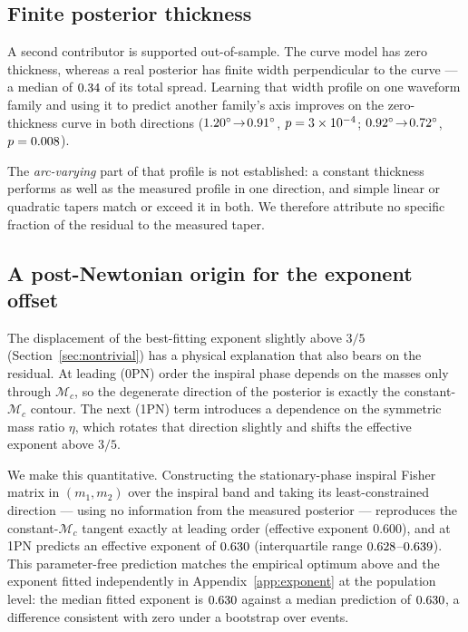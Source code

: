 \documentclass[aps,preprint,amsmath,amssymb,nofootinbib,superscriptaddress]{revtex4-2}
\begin{document}
\subsection{Finite posterior thickness}
\label{sec:thickness}
A second contributor is supported out-of-sample. The curve model has zero thickness, whereas a real
posterior has finite width perpendicular to the curve --- a median of $0.34$ of its total spread.
Learning that width profile on one waveform family and using it to predict another family's axis improves
on the zero-thickness curve in both directions ($1.20^\circ\!\to\!0.91^\circ$,
$p=3\times10^{-4}$; $0.92^\circ\!\to\!0.72^\circ$, $p=0.008$).

The \emph{arc-varying} part of that profile is not established: a constant thickness performs as well as
the measured profile in one direction, and simple linear or quadratic tapers match or exceed it in both. We
therefore attribute no specific fraction of the residual to the measured taper.

\subsection{A post-Newtonian origin for the exponent offset}
\label{sec:onepn}
The displacement of the best-fitting exponent slightly above $3/5$ (Section~\ref{sec:nontrivial}) has a
physical explanation that also bears on the residual. At leading (0PN) order the inspiral phase depends on
the masses only through $\mathcal{M}_c$, so the degenerate direction of the posterior is exactly the
constant-$\mathcal{M}_c$ contour. The next (1PN) term introduces a dependence on the symmetric mass ratio
$\eta$, which rotates that direction slightly and shifts the effective exponent above $3/5$.

We make this quantitative. Constructing the stationary-phase inspiral Fisher matrix in $(m_1,m_2)$ over the
inspiral band and taking its least-constrained direction --- using no information from the measured
posterior --- reproduces the constant-$\mathcal{M}_c$ tangent exactly at leading order (effective exponent
$0.600$), and at 1PN predicts an effective exponent of $0.630$ (interquartile range
$0.628$--$0.639$). This parameter-free prediction matches the empirical optimum above and
the exponent fitted independently in Appendix~\ref{app:exponent} at the population level: the median
fitted exponent is $0.630$ against a median prediction of $0.630$, a difference consistent with
zero under a bootstrap over events.
\end{document}
